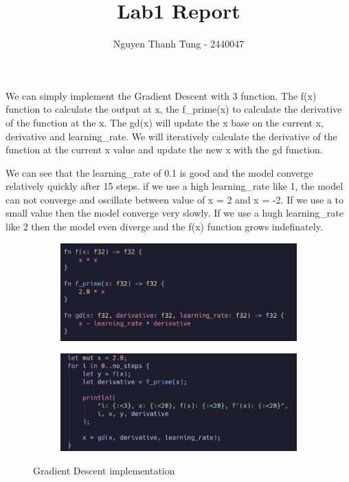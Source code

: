 \documentclass{article}
\title{Lab1 Report}
\author{Nguyen Thanh Tung - 2440047}
\begin{document}
\maketitle

We can simply implement the Gradient Descent with 3 function. The f(x) function to calculate the output at x, the f\_prime(x) to calculate the derivative of the function at the x. The gd(x) will update the x base on the current x, derivative and learning\_rate.
We will iteratively calculate the derivative of the function at the current x value and update the new x with the gd function.

We can see that the learning\_rate of 0.1 is good and the model converge relatively quickly after 15 steps. if we use a high learning\_rate like 1, the model can not converge and oscillate between value of x = 2 and x = -2. If we use a to small value then the model converge very slowly. If we use a hugh learning\_rate like 2 then the model even diverge and the f(x) function grows indefinately.

\begin{figure}[H]
    \centering
    \begin{subfigure}{0.4\linewidth}
        \centering
        \includegraphics[width=1\linewidth]{impl.png}
        \label{fig:enter-label}
    \end{subfigure}
    \begin{subfigure}{0.4\linewidth}
        \centering
        \includegraphics[width=1\linewidth]{impl2.png}
        \label{fig:enter-label}
    \end{subfigure}
    \caption{Gradient Descent implementation}
    \label{fig:enter-label}
\end{figure}
\end{document}
